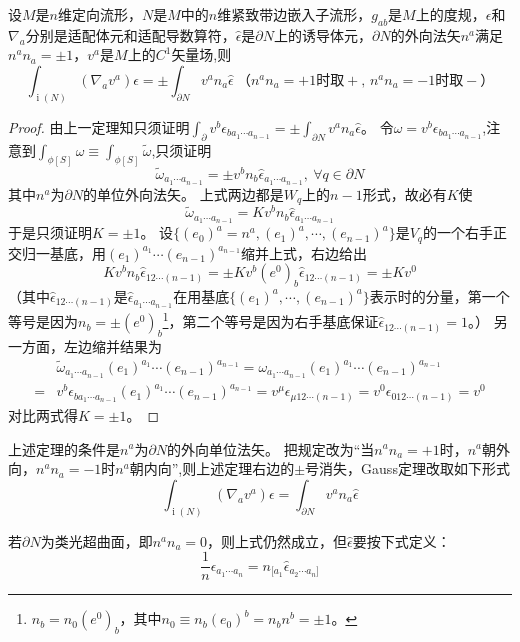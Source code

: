\begin{theorem}
    设$M$是$n$维定向流形，$N$是$M$中的$n$维紧致带边嵌入子流形，$g_{ab}$是$M$上的度规，$\epsilon$和$\nabla_a$分别是适配体元和适配导数算符，$\hat\epsilon$是$\partial N$上的诱导体元，$\partial N$的外向法矢$n^a$满足$n^an_a = \pm 1$，$v^a$是$M$上的$C^1$矢量场,则
    $$\int_{\operatorname{i}(N)}(\nabla_av^a)\epsilon = \pm \int_{\partial N}v^an_a\hat\epsilon ~ \text{（$n^an_a = +1$时取$+$, $n^an_a = -1$时取$-$）}$$
\end{theorem}

\begin{proof}
    由上一定理知只须证明$\displaystyle\int_{\partial}v^b\epsilon_{ba_1 \cdots a_{n - 1}} = \pm \int_{\partial N}v^an_a\hat\epsilon$。
    令$\omega = v^b\epsilon_{ba_1 \cdots a_{n - 1}}$,注意到$\displaystyle\int_{\phi[S]}\omega \equiv \int_{\phi[S]}\tilde\omega$,只须证明
    $$\tilde\omega_{a_1 \cdots a_{n - 1}} = \pm v^bn_b\hat\epsilon_{a_1 \cdots a_{n - 1}}, ~ \forall q \in \partial N$$
    其中$n^a$为$\partial N$的单位外向法矢。
    上式两边都是$W_q$上的$n - 1$形式，故必有$K$使
    $$\tilde\omega_{a_1 \cdots a_{n - 1}} = K v^bn_b\hat\epsilon_{a_1 \cdots a_{n - 1}}$$
    于是只须证明$K = \pm 1$。
    设$\{(e_0)^a = n^a, (e_1)^a, \cdots, (e_{n - 1})^a\}$是$V_q$的一个右手正交归一基底，用$(e_1)^{a_1} \cdots (e_{n - 1})^{a_{n - 1}}$缩并上式，右边给出
    $$Kv^bn_b\hat\epsilon_{12\cdots(n - 1)} = \pm Kv^b(e^0)_b\hat\epsilon_{12\cdots(n - 1)} = \pm K v^0$$
    （其中$\hat\epsilon_{12\cdots(n - 1)}$是$\hat\epsilon_{a_1 \cdots a_{n - 1}}$在用基底$\{(e_1)^a, \cdots, (e_{n - 1})^a\}$表示时的分量，第一个等号是因为$n_b = \pm(e^0)_b$\footnote{
        $n_b = n_0(e^0)_b$，其中$n_0 \equiv n_b(e_0)^b = n_bn^b = \pm 1$。
    }，第二个等号是因为右手基底保证$\hat\epsilon_{12\cdots(n - 1)} = 1$。）
    另一方面，左边缩并结果为
    \[\begin{split}
        & \tilde\omega_{a_1 \cdots a_{n - 1}}(e_1)^{a_1} \cdots (e_{n - 1})^{a_{n - 1}} = \omega_{a_1 \cdots a_{n - 1}}(e_1)^{a_1} \cdots (e_{n - 1})^{a_{n - 1}} \\
        = & v^b\epsilon_{b a_1 \cdots a_{n - 1}}(e_1)^{a_1} \cdots (e_{n - 1})^{a_{n - 1}} = v^\mu\epsilon_{\mu 1 2 \cdots (n - 1)} = v^0\epsilon_{0 1 2 \cdots (n - 1)} = v^0
    \end{split}\]
    对比两式得$K = \pm 1$。
\end{proof}

\begin{note}
    上述定理的条件是$n^a$为$\partial N$的外向单位法矢。
    把规定改为``当$n^an_a = +1$时，$n^a$朝外向，$n^an_a = -1$时$n^a$朝内向'',则上述定理右边的$\pm$号消失，Gauss定理改取如下形式
    $$\int_{\operatorname{i}(N)}(\nabla_av^a)\epsilon = \int_{\partial N}v^an_a\hat\epsilon$$
    
    若$\partial N$为类光超曲面，即$n^an_a = 0$，则上式仍然成立，但$\hat\epsilon$要按下式定义：
    $$\frac{1}{n}\epsilon_{a_1 \cdots a_n} = n_{[a_1}\hat\epsilon_{a_2 \cdots a_n]}$$
\end{note}

